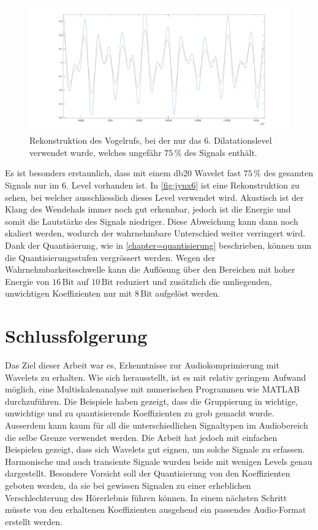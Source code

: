 \begin{refsection}
\begin{figure}
\label{fig:jynxAll}
\end{figure}
\begin{figure}
\centering
\includegraphics[width=\linewidth]{papers/compress/Bilder/jynxNear.pdf}
\caption{Rekonstruktion des Vogelrufs, bei der nur das 6. Dilatationslevel verwendet wurde, welches ungefähr $75\,\textbf{\%}$ des Signals enthält.}
\label{fig:jynx6}
\end{figure}


Es ist besonders erstaunlich, dass mit einem db20 Wavelet fast $75\,\text{\%}$ des gesamten Signals nur im 6. Level vorhanden ist.
In \autoref{fig:jynx6} ist eine Rekonstruktion zu sehen, bei welcher ausschliesslich dieses Level verwendet wird.
Akustisch ist der Klang des Wendehals immer noch gut erkennbar, jedoch ist die Energie und somit die Lautstärke des Signals niedriger.
Diese Abweichung kann dann noch skaliert werden, wodurch der wahrnehmbare Unterschied weiter verringert wird.
Dank der Quantisierung, wie in \autoref{chapter=quantisierung} beschrieben, können nun die Quantisierungsstufen vergrössert werden.
Wegen der Wahrnehmbarkeitsschwelle kann die Auflösung über den Bereichen mit hoher Energie von $16\,\text{Bit}$ auf $10\,\text{Bit}$ reduziert und zusätzlich die umliegenden, unwichtigen Koeffizienten nur mit $8\,\text{Bit}$ aufgelöst werden.

\section{Schlussfolgerung}
Das Ziel dieser Arbeit war es, Erkenntnisse zur Audiokomprimierung mit Wavelets zu erhalten.
Wie sich herausstellt, ist es mit relativ geringem Aufwand möglich, eine Multiskalenanalyse mit numerischen Programmen wie MATLAB durchzuführen.
%
Die Beispiele haben gezeigt, dass die Gruppierung in wichtige, unwichtige und zu quantisierende Koeffizienten zu grob gemacht wurde. 
Ausserdem kann kaum für all die unterschiedlichen Signaltypen im Audiobereich die selbe Grenze verwendet werden. 
Die Arbeit hat jedoch mit einfachen Beispielen gezeigt, dass sich Wavelets gut eignen, um solche Signale zu erfassen.
Harmonische und auch transiente Signale wurden beide mit wenigen Levels genau dargestellt.
Besondere Vorsicht soll der Quantisierung von den Koeffizienten geboten werden, da sie bei gewissen Signalen zu einer erheblichen Verschlechterung des Hörerlebnis führen können.
In einem nächsten Schritt müsste von den erhaltenen Koeffizienten ausgehend ein passendes Audio-Format erstellt werden.

\printbibliography[heading=subbibliography]
\end{refsection}
